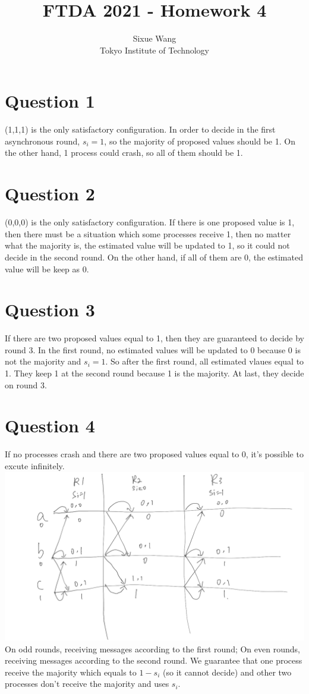 \documentclass{article}
\title{FTDA 2021 - Homework 4}
\author{Sixue Wang\\Tokyo Institute of Technology}
\begin{document}
\maketitle

\section*{Question 1}
(1,1,1) is the only satisfactory configuration. In order to decide in the first asynchronous round, $s_i=1$, so the majority of proposed values should be 1. On the other hand, 1 process could crash, so all of them should be 1.

\section*{Question 2}
(0,0,0) is the only satisfactory configuration. If there is one proposed value is 1, then there must be a situation which some processes receive 1, then no matter what the majority is, the estimated value will be updated to 1, so it could not decide in the second round. On the other hand, if all of them are 0, the estimated value will be keep as 0.

\section*{Question 3}
If there are two proposed values equal to 1, then they are guaranteed to decide by round 3. In the first round, no estimated values will be updated to 0 because 0 is not the majority and $s_i=1$. So after the first round, all estimated vlaues equal to 1. They keep 1 at the second round because 1 is the majority. At last, they decide on round 3.

\section*{Question 4}
If no processes crash and there are two proposed values equal to 0, it's possible to excute infinitely.
\includegraphics[width=\textwidth]{hw4_1}
On odd rounds, receiving messages according to the first round; On even rounds, receiving messages according to the second round.
We guarantee that one process receive the majority which equals to $1-s_i$ (so it cannot decide) and other two processes don't receive the majority and uses $s_i$.
\end{document}
